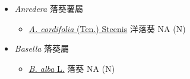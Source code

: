 
  \begin{itemize}
 \item[] \textit{Anredera} 落葵薯屬
                                
  \begin{itemize}
        \item[] \href{http://www.theplantlist.org/tpl1.1/search?q=Anredera+cordifolia}{\textit{A. cordifolia} (Ten.) Steenis}   洋落葵   NA (N)
  \end{itemize}
 \item[] \textit{Basella} 落葵屬
                                
  \begin{itemize}
        \item[] \href{http://www.theplantlist.org/tpl1.1/search?q=Basella+alba}{\textit{B. alba} L.}   落葵   NA (N)
  \end{itemize}
  \end{itemize}
